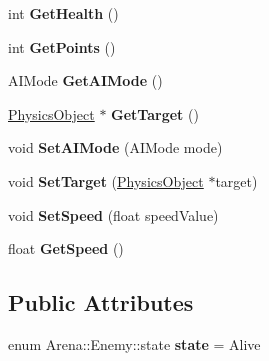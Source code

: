 \begin{DoxyCompactItemize}
\item 
\hypertarget{class_arena_1_1_enemy_acf79a7430de8d6e1830ca7ba2cdba09b}{int {\bfseries Get\+Health} ()}\label{class_arena_1_1_enemy_acf79a7430de8d6e1830ca7ba2cdba09b}

\item 
\hypertarget{class_arena_1_1_enemy_a7c121dd52072e2eda65ace4209a0e7fd}{int {\bfseries Get\+Points} ()}\label{class_arena_1_1_enemy_a7c121dd52072e2eda65ace4209a0e7fd}

\item 
\hypertarget{class_arena_1_1_enemy_ac9a6daf5675ba476c0104841be887e9a}{A\+I\+Mode {\bfseries Get\+A\+I\+Mode} ()}\label{class_arena_1_1_enemy_ac9a6daf5675ba476c0104841be887e9a}

\item 
\hypertarget{class_arena_1_1_enemy_a8cc2a2ff13b4a89cefbc23ac7822ab60}{\hyperlink{class_arena_1_1_physics_object}{Physics\+Object} $\ast$ {\bfseries Get\+Target} ()}\label{class_arena_1_1_enemy_a8cc2a2ff13b4a89cefbc23ac7822ab60}

\item 
\hypertarget{class_arena_1_1_enemy_a18dd97d9953cd8ac0159d7641c2756e4}{void {\bfseries Set\+A\+I\+Mode} (A\+I\+Mode mode)}\label{class_arena_1_1_enemy_a18dd97d9953cd8ac0159d7641c2756e4}

\item 
\hypertarget{class_arena_1_1_enemy_a1cf3f3c3677a2df47f94fd6203b3dc74}{void {\bfseries Set\+Target} (\hyperlink{class_arena_1_1_physics_object}{Physics\+Object} $\ast$target)}\label{class_arena_1_1_enemy_a1cf3f3c3677a2df47f94fd6203b3dc74}

\item 
\hypertarget{class_arena_1_1_enemy_affb40ac0643b2bf248f30afa5117a242}{void {\bfseries Set\+Speed} (float speed\+Value)}\label{class_arena_1_1_enemy_affb40ac0643b2bf248f30afa5117a242}

\item 
\hypertarget{class_arena_1_1_enemy_a86b8608c3c4ee16b119eaa8f878268e7}{float {\bfseries Get\+Speed} ()}\label{class_arena_1_1_enemy_a86b8608c3c4ee16b119eaa8f878268e7}

\end{DoxyCompactItemize}
\subsection*{Public Attributes}
\begin{DoxyCompactItemize}
\item 
\hypertarget{class_arena_1_1_enemy_a33ff6676f2db2d1a7ca544efae35ba89}{enum Arena\+::\+Enemy\+::state {\bfseries state} = Alive}\label{class_arena_1_1_enemy_a33ff6676f2db2d1a7ca544efae35ba89}

\end{DoxyCompactItemize}
